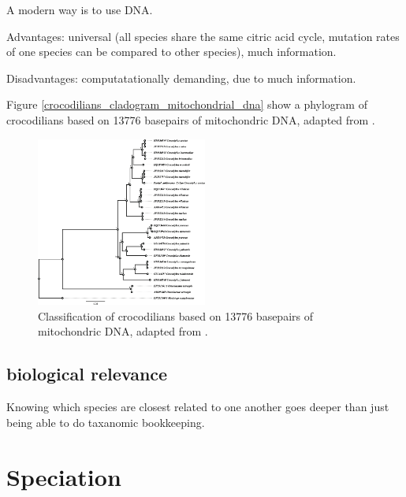 {A modern way is to use DNA.

Advantages: universal (all species share the same citric acid cycle,
mutation rates of one species can be compared to other species),
much information.

Disadvantages: computatationally demanding, due to much information.

Figure \ref{crocodilians_cladogram_mitochondrial_dna}
show a phylogram of crocodilians based on 13776 basepairs of
mitochondric DNA, adapted from \cite{milian2018mitogenomic}.


\begin{figure}[H]
  \includegraphics[width=0.5\textwidth]{milian_garcia_2018.png}
  \caption{
    Classification of crocodilians based on 13776 basepairs of
    mitochondric DNA, adapted from \cite{milian2018mitogenomic}.
  }
  \label{fig:crocodilians_cladogram_mitochondrial_dna}
\end{figure}


\subsection{biological relevance}

Knowing which species are closest related to
one another goes deeper than just
being able to do taxanomic bookkeeping. 


\section{Speciation}
 
}
